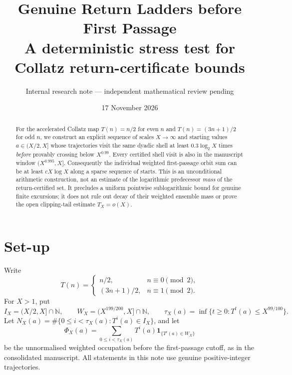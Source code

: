 \documentclass[11pt,a4paper]{article}
\title{Genuine Return Ladders before First Passage\\
\large A deterministic stress test for Collatz return-certificate bounds}
\author{Internal research note --- independent mathematical review pending}
\date{17 November 2026}
\newcommand{\NN}{\mathbb N}
\newcommand{\ind}{\mathbf 1}
\begin{document}
\maketitle
\begin{abstract}
For the accelerated Collatz map $T(n)=n/2$ for even $n$ and
$T(n)=(3n+1)/2$ for odd $n$, we construct an explicit sequence of
scales $X\to\infty$ and starting values $a\in(X/2,X]$ whose trajectories
visit the same dyadic shell at least $0.3\log_2X$ times \emph{before}
provably crossing below $X^{0.99}$. Every certified shell visit is also
in the manuscript window $(X^{0.995},X]$. Consequently the individual
weighted first-passage orbit sum can be at least $cX\log X$ along a
sparse sequence of starts. This is an unconditional arithmetic
construction, not an estimate of the logarithmic predecessor
\emph{mass} of the return-certified set. It precludes a uniform
pointwise sublogarithmic bound for genuine finite excursions; it does
not rule out decay of their weighted ensemble mass or prove the open
clipping-tail estimate $T_X=o(X)$.
\end{abstract}

\section{Set-up}
Write
\[
 T(n)=\begin{cases}n/2,&n\equiv0\pmod2,\\ (3n+1)/2,&n\equiv1\pmod2.\end{cases}
\]
For $X>1$, put
\[
 I_X=(X/2,X]\cap\NN,\qquad W_X=(X^{199/200},X]\cap\NN,
 \qquad \tau_X(a)=\inf\{t\ge0:T^t(a)\le X^{99/100}\}.
\]
Let $N_X(a)=\#\{0\le i<\tau_X(a):T^i(a)\in I_X\}$, and let
\[
 \Phi_X(a)=\sum_{0\le i<\tau_X(a)}T^i(a)\ind_{\{T^i(a)\in W_X\}}
\]
be the unnormalised weighted occupation before the first-passage
cutoff, as in the consolidated manuscript. All statements in this
note use genuine positive-integer trajectories.
\end{document}
